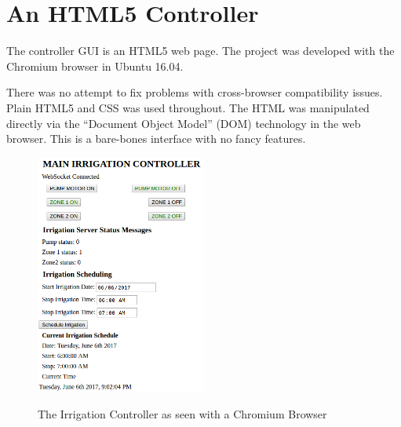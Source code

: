 %
%
%

\chapter{An HTML5 Controller}

The controller GUI is an HTML5 web page.  The project was developed with the 
Chromium browser in Ubuntu 16.04.

There was no attempt to fix problems with cross-browser compatibility issues.  
Plain HTML5 and CSS was used throughout.  The HTML was manipulated directly via 
the ``Document Object Model'' (DOM) technology in the web browser.  This is a 
bare-bones interface with no fancy features.

\begin{figure}[h]
	\centering
    \includegraphics[width=0.5\textwidth]{photos/browser_full.png}
	\centering\bfseries
	\caption{The Irrigation Controller as seen with a Chromium Browser}
\end{figure}

